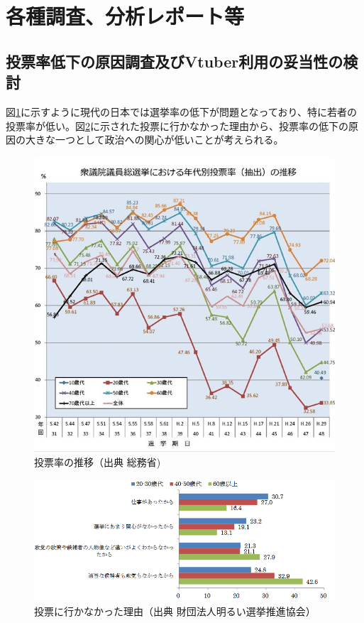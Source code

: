 \documentclass[a4paper,12pt]{jsarticle}
\begin{document}
\setcounter{section}{3}
\section{各種調査、分析レポート等}

\subsection{投票率低下の原因調査及びVtuber利用の妥当性の検討}

図\ref{fig:voterate}に示すように現代の日本では選挙率の低下が問題となっており、特に若者の投票率が低い。図\ref{fig:vote}に示された投票に行かなかった理由から、投票率の低下の原因の大きな一つとして政治への関心が低いことが考えられる。

\begin{figure}[H]
	\begin{center}
		\includegraphics[width=12.0cm]{voterate.jpg}
		\caption{投票率の推移（出典 総務省\cite{vote1})}
		\label{fig:voterate}
	\end{center}
\end{figure}

\begin{figure}[H]
	\begin{center}
		\includegraphics[width=12.0cm]{vote.png}
		\caption{投票に行かなかった理由（出典 財団法人明るい選挙推進協会\cite{vote2}）}
		\label{fig:vote}
	\end{center}
\end{figure}
\end{document}
